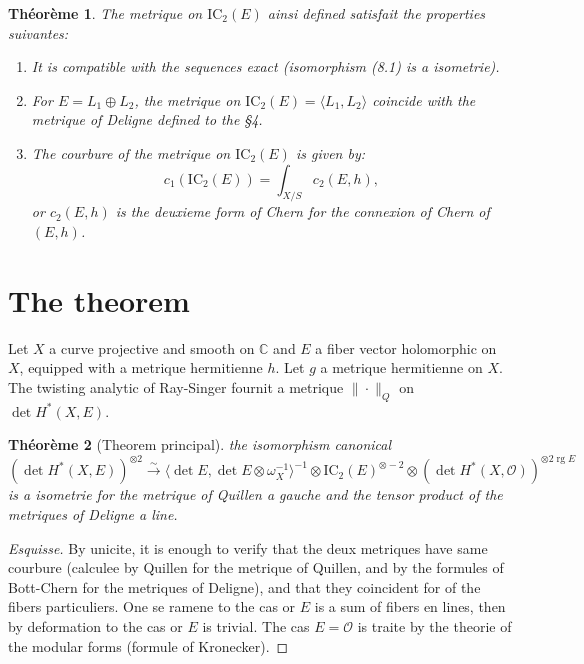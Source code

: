\documentclass[11pt,a4paper]{article}
\theoremstyle{plain}
\newtheorem{theorem}{Th\'eor\`eme}[section]
\theoremstyle{definition}
\DeclareMathOperator{\rg}{rg}
\newcommand{\IC}{\mathrm{IC}}
\newcommand{\C}{\mathbb{C}}
\newcommand{\cO}{\mathcal{O}}
\begin{document}
\begin{theorem}
The metrique on $\IC_2(E)$ ainsi defined satisfait the properties suivantes:
\begin{enumerate}
\item[(i)] It is compatible with the sequences exact (isomorphism (8.1) is a isometrie).
\item[(ii)] For $E = L_1 \oplus L_2$, the metrique on $\IC_2(E) = \langle L_1, L_2 \rangle$ coincide with the metrique of Deligne defined to the \S4.
\item[(iii)] The courbure of the metrique on $\IC_2(E)$ is given by:
\begin{equation}
c_1(\IC_2(E)) = \int_{X/S} c_2(E, h),
\end{equation}
or $c_2(E, h)$ is the deuxieme form of Chern for the connexion of Chern of $(E, h)$.
\end{enumerate}
\end{theorem}

\section{The theorem}

Let $X$ a curve projective and smooth on $\C$ and $E$ a fiber vector holomorphic on $X$, equipped with a metrique hermitienne $h$. Let $g$ a metrique hermitienne on $X$. The twisting analytic of Ray-Singer fournit a metrique $\|\cdot\|_Q$ on $\det H^*(X, E)$.

\begin{theorem}[Theorem principal]
the isomorphism canonical
\begin{equation}
(\det H^*(X, E))^{\otimes 2} \xrightarrow{\sim} \langle \det E, \det E \otimes \omega_X^{-1} \rangle^{-1} \otimes \IC_2(E)^{\otimes -2} \otimes (\det H^*(X, \cO))^{\otimes 2 \rg E}
\end{equation}
is a isometrie for the metrique of Quillen a gauche and the tensor product of the metriques of Deligne a line.
\end{theorem}

\begin{proof}[Esquisse]
By unicite, it is enough to verify that the deux metriques have same courbure (calculee by Quillen for the metrique of Quillen, and by the formules of Bott-Chern for the metriques of Deligne), and that they coincident for of the fibers particuliers. One se ramene to the cas or $E$ is a sum of fibers en lines, then by deformation to the cas or $E$ is trivial. The cas $E = \cO$ is traite by the theorie of the modular forms (formule of Kronecker).
\end{proof}
\end{document}
